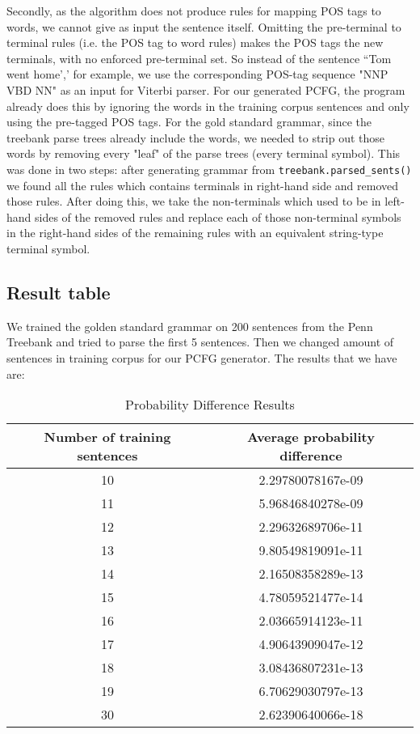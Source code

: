 \documentclass[paper=a4, fontsize=11pt]{scrartcl} %
\numberwithin{equation}{section} %
\numberwithin{figure}{section} %
\numberwithin{table}{section} %
\begin{document}
Secondly, as the algorithm does not produce rules for mapping POS tags to words, we cannot give as input the sentence itself. Omitting the pre-terminal to terminal rules (i.e. the POS tag to word rules) makes the POS tags the new terminals, with no enforced pre-terminal set. So instead of the sentence ``Tom went home',' for example, we use the corresponding POS-tag sequence "NNP VBD NN" as an input for Viterbi parser.
For our generated PCFG, the program already does this by ignoring the words in the training corpus sentences and only using the pre-tagged POS tags. 
For the gold standard grammar, since the treebank parse trees already include the words, we needed to strip out those words by removing every "leaf" of the parse trees (every terminal symbol). This was done in two steps: after generating grammar from \texttt{treebank.parsed\_sents()} we found all the rules which contains terminals in right-hand side and removed those rules. After doing this, we take the non-terminals which used to be in left-hand sides of the removed rules and replace each of those non-terminal symbols in the right-hand sides of the remaining rules with an equivalent string-type terminal symbol.

\subsection{Result table}

We trained the golden standard grammar on 200 sentences from the Penn Treebank and tried to parse the first 5 sentences. Then we changed amount of sentences in training corpus for our PCFG generator. The results that we have are:

\begin{table}[ht]
\caption{Probability Difference Results}
\centering
\begin{tabular}{c c}
\hline\hline
Number of training sentences & Average probability difference \\ [0.5ex]
\hline
10&2.29780078167e-09 \\
11&5.96846840278e-09 \\
12&2.29632689706e-11 \\
13&9.80549819091e-11 \\
14& 2.16508358289e-13 \\
15&4.78059521477e-14 \\
16&2.03665914123e-11 \\
17&4.90643909047e-12 \\
18&3.08436807231e-13 \\
19&6.70629030797e-13 \\
30&2.62390640066e-18 \\ [1ex]
\hline
\end{tabular}
\label{table:nonlin}
\end{table}
\end{document}
